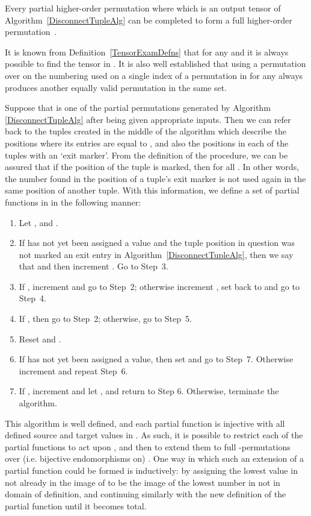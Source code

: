 \documentclass{LMCS}
\theoremstyle{plain}\newtheorem*{cLm}{Claim}
\begin{document}
  \begin{lem} \label{ConAlgCompleteLemma} Every partial higher-order
    permutation  where  which is an
    output tensor of Algorithm~\ref{DisconnectTupleAlg} can be
    completed to form a full higher-order permutation~.
  \end{lem}
  \proof
    It is known from Definition~\ref{TensorExamDefns} that for any  and  it is always possible to
    find the tensor  in . It is also well established that using a permutation over  on the numbering
    used on a single index of a permutation in  for any  always produces another equally valid permutation in the same set.
    
  Suppose that  is one of the partial permutations generated by Algorithm \ref{DisconnectTupleAlg} after being given appropriate inputs. Then we can refer back to the tuples  created in the middle of the algorithm which describe the positions where its entries are equal to , and also the positions in each of the tuples with an `exit marker'. From the definition of the procedure, we can be assured that if the  position of the  tuple is marked, then  for all . In other words, the number found in the position of a tuple's exit marker is not used again in the same position of another tuple. With
    this information, we define a set of partial functions in 
     in the following manner:
    \begin{enumerate}
    \item Let ,  and .
    \item If  has not yet been assigned a value
      and the tuple position in question was not marked an exit entry in Algorithm~\ref{DisconnectTupleAlg}, then we say that
       and then increment . Go to
      Step~3.
    \item If , increment  and go to Step~2; otherwise
      increment , set  back to  and go to Step~4.
    \item If , then go to Step~2; otherwise, go to Step~5.
    \item Reset  and .
    \item If  has not yet been assigned a value,
      then set  and go to Step~7. Otherwise increment 
      and repeat Step~6.
    \item If , increment  and let , and return to Step
      6. Otherwise, terminate the algorithm.
    \end{enumerate}
  
\noindent     This algorithm is well defined, and each partial function
     is injective with all defined source and target values
    in . As such, it is possible to restrict each of the partial
    functions to act upon , and then to extend them to full
    -permutations over (i.e. bijective endomorphisms on) . One way in which such an extension of a partial function  could be formed is inductively: by assigning the lowest value in  not already in the image of  to be the image of the lowest number in  not in domain of definition, and continuing similarly with the new definition of the partial function until it becomes total.
    
\end{document}
